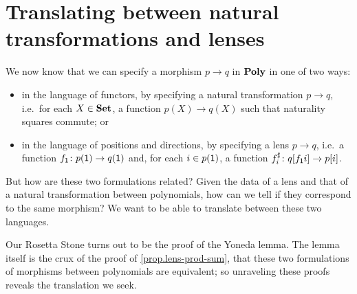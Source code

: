 \documentclass[Book-Poly]{subfiles}
\begin{document}
\section{Translating between natural transformations and lenses} \label{subsec.poly.cat.morph.translate}
We now know that we can specify a morphism $p\to q$ in $\mathbf{Poly}$ in one of two ways:
\begin{itemize}
    \item in the language of functors, by specifying a natural transformation $p \to q$, i.e.\ for each $X\in\mathbf{Set}$, a function $p(X)\to q(X)$ such that naturality squares commute; or
    \item in the language of positions and directions, by specifying a lens $p\to q$, i.e.\ a function $f_{\textsf{1}} \colon p(\textsf{1}) \to q(\textsf{1})$ and, for each $i \in p(\textsf{1})$, a function $f^\sharp_i \colon q[f_{\textsf{1}}i] \to p[i]$.
\end{itemize}
But how are these two formulations related?
Given the data of a lens and that of a natural transformation between polynomials, how can we tell if they correspond to the same morphism?
We want to be able to translate between these two languages.

Our Rosetta Stone turns out to be the proof of the Yoneda lemma.
The lemma itself is the crux of the proof of \cref{prop.lens-prod-sum}, that these two formulations of morphisms between polynomials are equivalent; so unraveling these proofs reveals the translation we seek.
\end{document}
